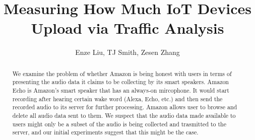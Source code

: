 \documentclass[sigconf,anonymous=false]{acmart}
\begin{document}
\title{Measuring How Much IoT Devices Upload via Traffic Analysis} %
\author{Enze Liu, TJ Smith, Zesen Zhang}


\begin{abstract}
We examine the problem of whether Amazon is being honest with users in terms of presenting the audio data it claims to be collecting by its smart speakers. Amazon Echo is Amazon's smart speaker that has an always-on mircophone. It would start recording after hearing certain wake word (Alexa, Echo, etc.) and then send the recorded audio to its server for further processing. Amazon allows user to browse and delete all audio data sent to them. We suspect that the audio data made available to users might only be a subset of the audio is being collected and trasmitted to the server, and our initial experiments suggest that this might be the case.
\end{abstract}



\maketitle




\end{document}
